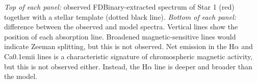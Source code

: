 \label{fig:emission1} \emph{Top of each panel:} observed FDBinary-extracted spectrum of Star 1 (red) together with a stellar template (dotted black line). \emph{Bottom of each panel:} difference between the observed and model spectra. Vertical lines show the position of each absorption line. Broadened magnetic-sensitive lines would indicate Zeeman splitting, but this is not observed. Net emission in the H$\alpha$ and {\rm Ca}\kern 0.1em{\sc ii} lines is a characteristic signature of chromospheric magnetic activity, but this is not observed either. Instead, the H$\alpha$ line is deeper and broader than the model.
  
  
  
  
  
  
  
  